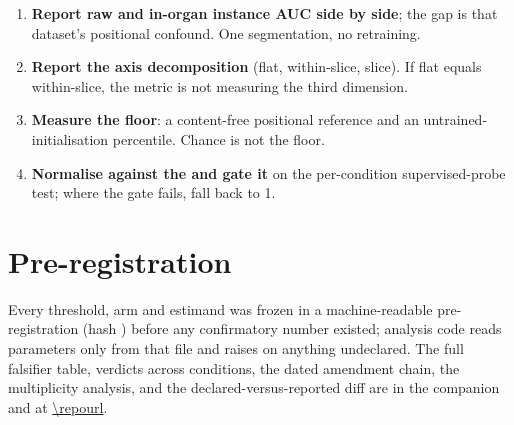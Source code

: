 \documentclass[conference]{IEEEtran}
\begin{document}
\begin{enumerate}\itemsep1pt
\item \textbf{Report raw and in-organ instance AUC side by side}; the gap is
that dataset's positional confound. One segmentation, no retraining.
\item \textbf{Report the axis decomposition} (flat, within-slice, slice). If
flat equals within-slice, the metric is not measuring the third dimension.
\item \textbf{Measure the floor}: a content-free positional reference and an
untrained-initialisation percentile. Chance is not the floor.
\item \textbf{Normalise against the \attden{} and gate it} on the
per-condition supervised-probe test; where the gate fails, fall back to 1.
\end{enumerate}

\section{Pre-registration}

Every threshold, arm and estimand was frozen in a machine-readable
pre-registration (hash \preghash{}) before any confirmatory number existed;
analysis code reads parameters only from that file and raises on anything
undeclared. The full falsifier table, verdicts across conditions, the dated
amendment chain, the multiplicity analysis, and the declared-versus-reported
diff are in the companion and at \url{\repourl}.


\end{document}

